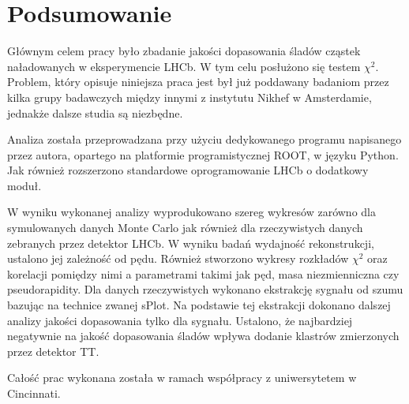 \chapter*{Podsumowanie}

Głównym celem pracy było zbadanie jakości dopasowania śladów cząstek naładowanych w eksperymencie LHCb. W tym celu posłużono się testem $\chi^2$. Problem, który opisuje niniejsza praca jest był już poddawany badaniom przez kilka grupy badawczych między innymi z instytutu Nikhef w Amsterdamie, jednakże dalsze studia są niezbędne.  

Analiza została przeprowadzana przy użyciu dedykowanego programu napisanego przez autora, opartego na platformie programistycznej ROOT, w języku Python. Jak również rozszerzono standardowe oprogramowanie LHCb o dodatkowy moduł. 


W wyniku wykonanej analizy wyprodukowano szereg wykresów zarówno dla symulowanych danych Monte Carlo jak również dla rzeczywistych danych zebranych przez detektor LHCb. W wyniku badań  wydajność rekonstrukcji, ustalono jej zależność od pędu. Również stworzono wykresy rozkładów $\chi^2$ oraz korelacji pomiędzy nimi a parametrami takimi jak pęd, masa niezmienniczna czy pseudorapidity. Dla danych rzeczywistych wykonano ekstrakcję sygnału od szumu bazując na technice zwanej sPlot. Na podstawie tej ekstrakcji dokonano dalszej analizy jakości dopasowania tylko dla sygnału. Ustalono, że najbardziej negatywnie na jakość dopasowania śladów wpływa dodanie klastrów zmierzonych przez detektor TT. 

Całość prac wykonana została w ramach współpracy z uniwersytetem w Cincinnati. 
